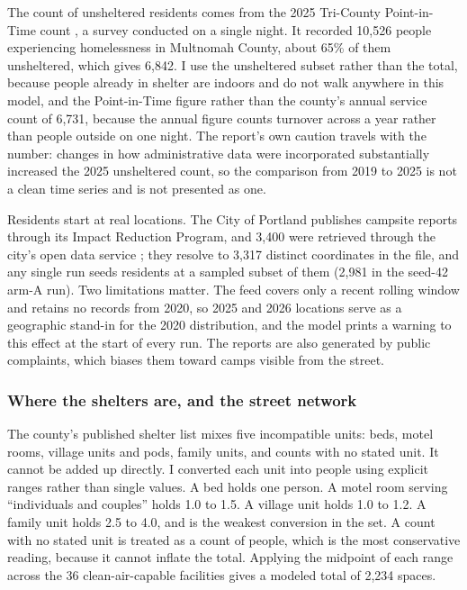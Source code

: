 \documentclass[graybox]{svmult}
\begin{document}
The count of unsheltered residents comes from the 2025 Tri-County Point-in-Time
count \cite{psupit2025}, a survey conducted on a single night. It recorded 10,526
people experiencing homelessness in Multnomah County, about 65\% of them
unsheltered, which gives 6,842. I use the unsheltered subset rather than the
total, because people already in shelter are indoors and do not walk anywhere in
this model, and the Point-in-Time figure rather than the county's annual service
count of 6,731, because the annual figure counts turnover across a year rather
than people outside on one night. The report's own caution travels with the
number: changes in how administrative data were incorporated substantially
increased the 2025 unsheltered count, so the comparison from 2019 to 2025 is not
a clean time series and is not presented as one.

Residents start at real locations. The City of Portland publishes campsite
reports through its Impact Reduction Program, and 3,400 were retrieved through
the city's open data service \cite{portlandcampsites}; they resolve to 3,317
distinct coordinates in the file, and any single run seeds residents at a
sampled subset of them (2,981 in the seed-42 arm-A run). Two limitations matter. The feed
covers only a recent rolling window and retains no records from 2020, so 2025 and
2026 locations serve as a geographic stand-in for the 2020 distribution, and the
model prints a warning to this effect at the start of every run. The reports are
also generated by public complaints, which biases them toward camps visible from
the street.

\subsubsection{Where the shelters are, and the street network}
\label{sec:shelters}

The county's published shelter list \cite{multcohsd} mixes five incompatible
units: beds, motel rooms, village units and pods, family units, and counts with
no stated unit. It cannot be added up directly. I converted each unit into people
using explicit ranges rather than single values. A bed holds one person. A motel
room serving ``individuals and couples'' holds 1.0 to 1.5. A village unit holds
1.0 to 1.2. A family unit holds 2.5 to 4.0, and is the weakest conversion in the
set. A count with no stated unit is treated as a count of people, which is the
most conservative reading, because it cannot inflate the total. Applying the
midpoint of each range across the 36 clean-air-capable facilities gives a modeled
total of 2,234 spaces.
\end{document}
